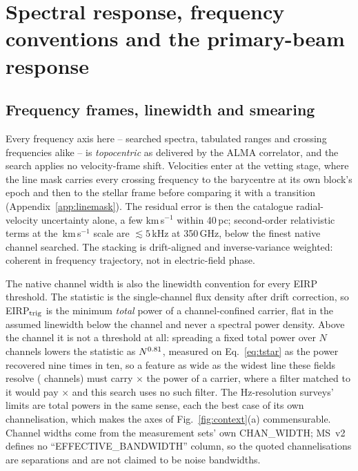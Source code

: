 \section{Spectral response, frequency conventions and the primary-beam
response}
\label{app:conventions}


\subsection{Frequency frames, linewidth and smearing}

Every frequency axis here -- searched spectra, tabulated ranges and
crossing frequencies alike -- is \emph{topocentric} as delivered by the
ALMA correlator, and the search applies no velocity-frame shift.
Velocities enter at the vetting stage, where the line mask carries every
crossing frequency to the barycentre at its own block's epoch and then to the
stellar frame before comparing it with a transition
(Appendix~\ref{app:linemask}). The residual error is then the catalogue
radial-velocity uncertainty alone, a few km\,s$^{-1}$ within 40\,pc;
second-order relativistic terms at the \MaskHalfKms\,km\,s$^{-1}$
scale are $\lesssim5$\,kHz at 350\,GHz, below the finest native channel
searched. The stacking is drift-aligned and inverse-variance weighted:
coherent in frequency trajectory, not in electric-field phase.

The native channel width is also the linewidth convention for every EIRP
threshold. The statistic is the single-channel flux density after drift
correction, so EIRP$_{\rm trig}$ is the minimum \emph{total} power of a
channel-confined carrier, flat in the assumed linewidth below the channel and
never a spectral power density. Above the channel it is not a threshold at
all: spreading a fixed total power over $N$ channels lowers the statistic as
$N^{0.81}$, measured on Eq.~\ref{eq:tstar} as the power recovered nine
times in ten, so a feature as wide as the widest line these fields resolve
(\ScNBroadChan{} channels) must carry \ScNBroadRatio$\times$ the power of a
carrier, where a filter matched to it would pay
\ScNBroadRatioMatched$\times$ and this search uses no such filter. The
Hz-resolution surveys' limits are total powers in the same sense, each the
best case of its own channelisation, which makes the axes of
Fig.~\ref{fig:context}(a) commensurable. Channel widths come from the
measurement sets' own CHAN\_WIDTH; MS~v2 defines no
``EFFECTIVE\_BANDWIDTH'' column, so the quoted channelisations are separations
and are not claimed to be noise bandwidths.

